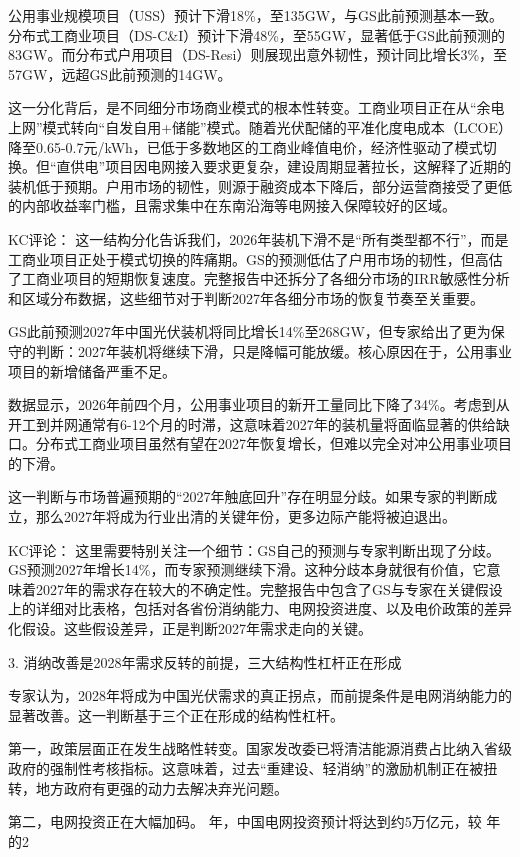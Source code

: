 \documentclass[11pt]{ctexart}
\begin{document}
公用事业规模项目（USS）预计下滑18\%，至135GW，与GS此前预测基本一致。分布式工商业项目（DS-C\&I）预计下滑48\%，至55GW，显著低于GS此前预测的83GW。而分布式户用项目（DS-Resi）则展现出意外韧性，预计同比增长3\%，至57GW，远超GS此前预测的14GW。

这一分化背后，是不同细分市场商业模式的根本性转变。工商业项目正在从“余电上网”模式转向“自发自用+储能”模式。随着光伏配储的平准化度电成本（LCOE）降至0.65-0.7元/kWh，已低于多数地区的工商业峰值电价，经济性驱动了模式切换。但“直供电”项目因电网接入要求更复杂，建设周期显著拉长，这解释了近期的装机低于预期。户用市场的韧性，则源于融资成本下降后，部分运营商接受了更低的内部收益率门槛，且需求集中在东南沿海等电网接入保障较好的区域。

KC评论： 这一结构分化告诉我们，2026年装机下滑不是“所有类型都不行”，而是工商业项目正处于模式切换的阵痛期。GS的预测低估了户用市场的韧性，但高估了工商业项目的短期恢复速度。完整报告中还拆分了各细分市场的IRR敏感性分析和区域分布数据，这些细节对于判断2027年各细分市场的恢复节奏至关重要。

GS此前预测2027年中国光伏装机将同比增长14\%至268GW，但专家给出了更为保守的判断：2027年装机将继续下滑，只是降幅可能放缓。核心原因在于，公用事业项目的新增储备严重不足。

数据显示，2026年前四个月，公用事业项目的新开工量同比下降了34\%。考虑到从开工到并网通常有6-12个月的时滞，这意味着2027年的装机量将面临显著的供给缺口。分布式工商业项目虽然有望在2027年恢复增长，但难以完全对冲公用事业项目的下滑。

这一判断与市场普遍预期的“2027年触底回升”存在明显分歧。如果专家的判断成立，那么2027年将成为行业出清的关键年份，更多边际产能将被迫退出。

KC评论： 这里需要特别关注一个细节：GS自己的预测与专家判断出现了分歧。GS预测2027年增长14\%，而专家预测继续下滑。这种分歧本身就很有价值，它意味着2027年的需求存在较大的不确定性。完整报告中包含了GS与专家在关键假设上的详细对比表格，包括对各省份消纳能力、电网投资进度、以及电价政策的差异化假设。这些假设差异，正是判断2027年需求走向的关键。

3. 消纳改善是2028年需求反转的前提，三大结构性杠杆正在形成

专家认为，2028年将成为中国光伏需求的真正拐点，而前提条件是电网消纳能力的显著改善。这一判断基于三个正在形成的结构性杠杆。

第一，政策层面正在发生战略性转变。国家发改委已将清洁能源消费占比纳入省级政府的强制性考核指标。这意味着，过去“重建设、轻消纳”的激励机制正在被扭转，地方政府有更强的动力去解决弃光问题。

第二，电网投资正在大幅加码。 年，中国电网投资预计将达到约5万亿元，较 年的2
\end{document}
